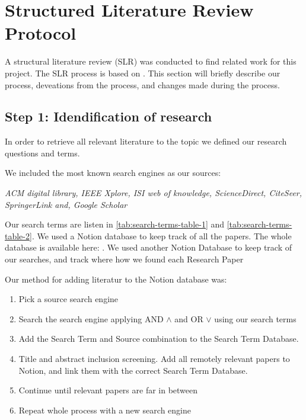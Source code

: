 
\section{Structured Literature Review Protocol}

A structural literature review (SLR) was conducted to find related work for this project.
The SLR process is based on \cite{AndersKofod-Petersen2018}.
This section will briefly describe our process, deveations from the process,
and changes made during the process.

\subsection{Step 1: Idendification of research}
In order to retrieve all relevant literature to the topic we defined our
research questions and terms.

We included the most known search engines as our sources:

\textit{
ACM digital library,
IEEE Xplore,
ISI web of knowledge,
ScienceDirect,
CiteSeer,
SpringerLink and,
Google Scholar
}

Our search terms are listen in \autoref{tab:search-terms-table-1} and \autoref{tab:search-terms-table-2}.
We used a Notion database to keep track of all the papers. The whole database is available here: \cite{slrdatabase}.
We used another Notion Database to keep track of our searches, and track where how we found each Research Paper
\cite{searchtermtable}

Our method for adding literatur to the Notion database was:
\begin{enumerate}
    \item Pick a source search engine
    \item Search the search engine applying AND $\wedge$ and OR $\vee$ using our search terms
    \item Add the Search Term and Source combination to the Search Term Database.
    \item Title and abstract inclusion screening. Add all remotely relevant papers to Notion, and link them with the correct Search Term Database.
    \item Continue until relevant papers are far in between
    \item Repeat whole process with a new search engine
\end{enumerate}


